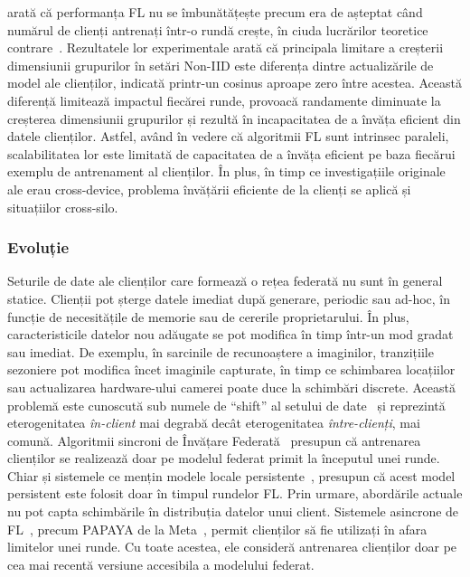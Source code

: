 \citet{LargeCohorts} arată că performanța FL nu se îmbunătățește precum era de așteptat când numărul de clienți antrenați într-o rundă crește, în ciuda lucrărilor teoretice contrare~\citep{TighterTheory}. Rezultatele lor experimentale arată că principala limitare a creșterii dimensiunii grupurilor în setări Non-IID este diferența dintre actualizările de model ale clienților, indicată printr-un cosinus aproape zero între acestea. Această diferență limitează impactul fiecărei runde, provoacă randamente diminuate la creșterea dimensiunii grupurilor și rezultă în incapacitatea de a învăța eficient din datele clienților. Astfel, având în vedere că algoritmii FL sunt intrinsec paraleli, scalabilitatea lor este limitată de capacitatea de a învăța eficient pe baza fiecărui exemplu de antrenament al clienților. În plus, în timp ce investigațiile originale ale \citet{ScaleSystemDesign,LargeCohorts} erau cross-device, problema învățării eficiente de la clienți se aplică și situațiilor cross-silo.


\subsubsection{Evoluție}
Seturile de date ale clienților care formează o rețea federată nu sunt în general statice. Clienții pot șterge datele imediat după generare, periodic sau ad-hoc, în funcție de necesitățile de memorie sau de cererile proprietarului. În plus, caracteristicile datelor nou adăugate se pot modifica în timp într-un mod gradat sau imediat. De exemplu, în sarcinile de recunoaștere a imaginilor, tranzițiile sezoniere pot modifica încet imaginile capturate, în timp ce schimbarea locațiilor sau actualizarea hardware-ului camerei poate duce la schimbări discrete. Această problemă este cunoscută sub numele de ``shift'' al setului de date~\citep[sec. 3.1]{AdvancedAndOpenProblems} și reprezintă eterogenitatea \emph{în-client} mai degrabă decât eterogenitatea \emph{între-clienți}, mai comună. Algoritmii sincroni de Învățare Federată~\citep{FedAvg,FedOPT,QFedAvg} presupun că antrenarea clienților se realizează doar pe modelul federat primit la începutul unei runde. Chiar și sistemele ce mențin modele locale persistente~\citep{Ditto}, presupun că acest model persistent este folosit doar în timpul rundelor FL. Prin urmare, abordările actuale nu pot capta schimbările în distribuția datelor unui client. Sistemele asincrone de FL~\citep{AsynchronousFLonHetDevicesSurvey,FedBuff}, precum PAPAYA de la Meta~\citep{PAPAYA}, permit clienților să fie utilizați în afara limitelor unei runde. Cu toate acestea, ele consideră antrenarea clienților doar pe cea mai recentă versiune accesibila a modelului federat.

